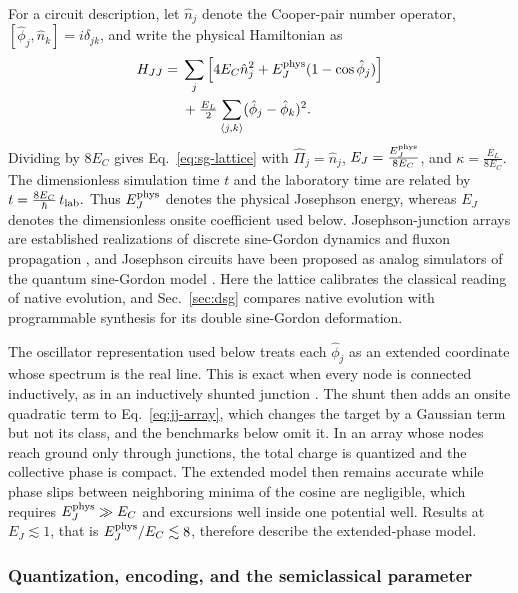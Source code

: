 \documentclass[pra,twocolumn,superscriptaddress,nofootinbib,floatfix]{revtex4-2}
\theoremstyle{remark}
\newcommand{\revcolor}{\color{blue}}
\DeclareRobustCommand{\rev}[1]{{\revcolor #1}}
\begin{document}
For a circuit description, let $\hat n_j$ denote the Cooper-pair number operator, $[\hat\phi_j,\hat n_k]=i\delta_{jk}$, and write the physical Hamiltonian as
\begin{align}
H_{JJ}={}&\sum_j\left[4E_C\hat n_j^2+E_J^{\rm phys}(1-\cos\hat\phi_j)\right]\nonumber\\
&+\tfrac{E_L}{2}\sum_{\langle j,k\rangle}(\hat\phi_j-\hat\phi_k)^2.
\label{eq:jj-array}
\end{align}
\rev{Dividing by $8E_C$ gives Eq.~\eqref{eq:sg-lattice} with \(\hat\Pi_j=\hat n_j\), \(E_J=\tfrac{E_J^{\rm phys}}{8E_C}\), and \(\kappa=\tfrac{E_L}{8E_C}\).} \rev{The dimensionless simulation time \(t\) and the laboratory time are related by \(t=\tfrac{8E_C}{\hbar}\,t_{\rm lab}.\)} Thus \(E_J^{\rm phys}\) denotes the physical Josephson energy, whereas \(E_J\) denotes the dimensionless onsite coefficient used below. \rev{Josephson-junction arrays are established realizations of discrete sine-Gordon dynamics and fluxon propagation \cite{Ustinov1995DiscreteSG,Ustinov1998Solitons}, and Josephson circuits have been proposed as analog simulators of the quantum sine-Gordon model \cite{Roy2021}.} \rev{Here the lattice calibrates the classical reading of native evolution, and Sec.~\ref{sec:dsg} compares native evolution with programmable synthesis for its double sine-Gordon deformation.}

\rev{The oscillator representation used below treats each \(\hat\phi_j\) as an extended coordinate whose spectrum is the real line.} \rev{This is exact when every node is connected inductively, as in an inductively shunted junction \cite{Manucharyan2009Fluxonium,Koch2009Rf}.} \rev{The shunt then adds an onsite quadratic term to Eq.~\eqref{eq:jj-array}, which changes the target by a Gaussian term but not its class, and the benchmarks below omit it.} \rev{In an array whose nodes reach ground only through junctions, the total charge is quantized and the collective phase is compact.} \rev{The extended model then remains accurate while phase slips between neighboring minima of the cosine are negligible, which requires \(E_J^{\rm phys}\gg E_C\) and excursions well inside one potential well.} \rev{Results at \(E_J\lesssim1\), that is \(E_J^{\rm phys}/E_C\lesssim8\), therefore describe the extended-phase model.}

\subsubsection{Quantization, encoding, and the semiclassical parameter}
\label{subsec:sg-quantization}
\end{document}
